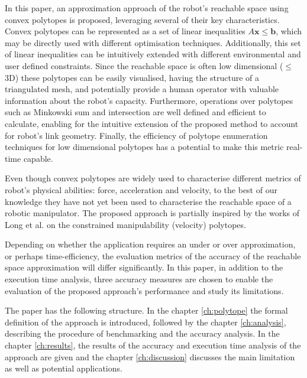 In this paper, an approximation approach of the robot's reachable space using convex polytopes is proposed, leveraging several of their key characteristics. Convex polytopes can be represented as a set of linear inequalities $A\bm{x}\leq\bm{b}$, which may be directly used with different optimisation techniques. Additionally, this set of linear inequalities can be intuitively extended with different environmental and user defined constraints. Since the reachable space is often low dimensional ($\leq$3D) these polytopes can be easily visualised, having the structure of a triangulated mesh, and potentially provide a human operator with valuable information about the robot's capacity. Furthermore, operations over polytopes such as Minkowski sum and intersection are well defined and efficient to calculate, enabling for the intuitive extension of the proposed method to account for robot's link geometry. Finally, the efficiency of polytope enumeration techniques for low dimensional polytopes has a potential to make this metric real-time capable. 

Even though convex polytopes are widely used to characterise different metrics of robot's physical abilities\cite{skuric2021}: force, acceleration  and velocity, to the best of our knowledge they have not yet been used to characterise the reachable space of a robotic manipulator. 
The proposed approach is partially inspired by the works of Long et al. \cite{long2018} on the constrained manipulability (velocity) polytopes.  

Depending on whether the application requires an under or over approximation, or perhaps time-efficiency, the evaluation metrics of the accuracy of the reachable space approximation will differ significantly. In this paper, in addition to the execution time analysis, three accuracy measures are chosen to enable the evaluation of the proposed approach's performance and study its limitations.

The paper has the following structure. In the chapter \ref{ch:polytope} the formal definition of the approach is introduced, followed by the chapter \ref{ch:analysis}, describing the procedure of benchmarking and the accuracy analysis. In the chapter \ref{ch:results}, the results of the accuracy and execution time analysis of the approach are given and the chapter \ref{ch:discussion} discusses the main limitation as well as potential applications.

